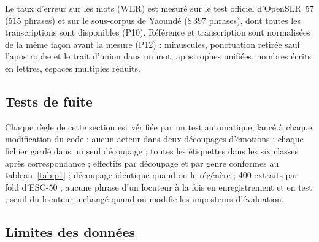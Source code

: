 Le taux d'erreur sur les mots (WER) est mesuré sur le test officiel d'OpenSLR~57 (515 phrases)
et sur le sous-corpus de Yaoundé (8\,397 phrases), dont toutes les transcriptions sont
disponibles (P10). Référence et transcription sont normalisées de la même façon avant la
mesure (P12) : minuscules, ponctuation retirée sauf l'apostrophe et le trait d'union dans un
mot, apostrophes unifiées, nombres écrits en lettres, espaces multiples réduits.


\subsection{Tests de fuite}
\label{sec:tests-fuite}

Chaque règle de cette section est vérifiée par un test automatique, lancé à chaque
modification du code : aucun acteur dans deux découpages d'émotions ; chaque fichier gardé dans
un seul découpage ; toutes les étiquettes dans les six classes après correspondance ; effectifs
par découpage et par genre conformes au tableau~\ref{tab:p1} ; découpage identique quand on le
régénère ; 400 extraits par fold d'ESC-50 ; aucune phrase d'un locuteur à la fois en
enregistrement et en test ; seuil du locuteur inchangé quand on modifie les imposteurs
d'évaluation.

\subsection{Limites des données}
\label{sec:limites-donnees}

